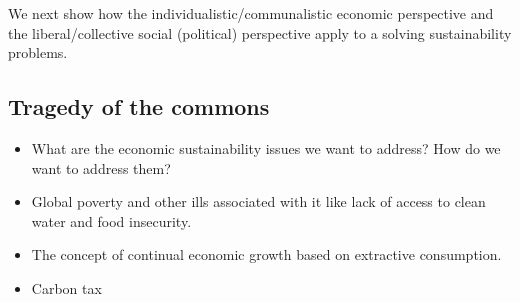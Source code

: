\documentclass[12pt]{article}
\begin{document}
We next show how the individualistic/communalistic economic perspective and the liberal/collective social (political) perspective
apply to a solving sustainability problems.

\subsection{Tragedy of the commons}
\label{sec:totc}



\begin{itemize}
\item{What are the economic sustainability issues we want to address? How do we want to address them?}
\item{Global poverty and other ills associated with it like lack of access to clean water and food insecurity.}
\item{The concept of continual economic growth based on extractive consumption.}
\item{Carbon tax}
\end{itemize}
%
%
%

\end{document}
